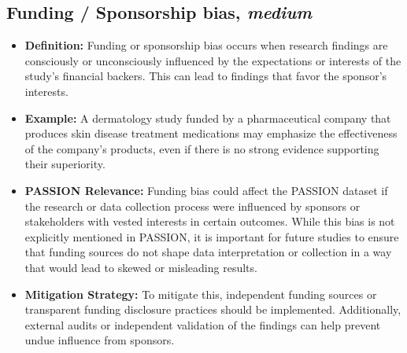 \begin{refsection}
		\subsection{Funding / Sponsorship bias, \textit{medium}}
		\begin{itemize}
			\item \textbf{Definition:} Funding or sponsorship bias occurs when research findings are consciously or unconsciously influenced by the expectations or interests of the study’s financial backers. This can lead to findings that favor the sponsor’s interests.
			\item \textbf{Example:} A dermatology study funded by a pharmaceutical company that produces skin disease treatment medications may emphasize the effectiveness of the company's products, even if there is no strong evidence supporting their superiority.
			\item \textbf{PASSION Relevance:} Funding bias could affect the PASSION dataset if the research or data collection process were influenced by sponsors or stakeholders with vested interests in certain outcomes. While this bias is not explicitly mentioned in PASSION, it is important for future studies to ensure that funding sources do not shape data interpretation or collection in a way that would lead to skewed or misleading results.
			\item \textbf{Mitigation Strategy:} To mitigate this, independent funding sources or transparent funding disclosure practices should be implemented. Additionally, external audits or independent validation of the findings can help prevent undue influence from sponsors.
		\end{itemize}
		

\end{refsection}
